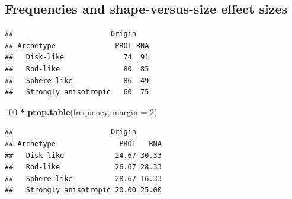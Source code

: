 \documentclass[
  10pt,
]{article}
\newenvironment{Shaded}{\begin{snugshade}}{\end{snugshade}}
\newcommand{\AttributeTok}[1]{\textcolor[rgb]{0.13,0.29,0.53}{#1}}
\newcommand{\CommentTok}[1]{\textcolor[rgb]{0.56,0.35,0.01}{\textit{#1}}}
\newcommand{\DecValTok}[1]{\textcolor[rgb]{0.00,0.00,0.81}{#1}}
\newcommand{\FunctionTok}[1]{\textcolor[rgb]{0.13,0.29,0.53}{\textbf{#1}}}
\newcommand{\NormalTok}[1]{#1}
\newcommand{\OtherTok}[1]{\textcolor[rgb]{0.56,0.35,0.01}{#1}}
\newcommand{\SpecialCharTok}[1]{\textcolor[rgb]{0.81,0.36,0.00}{\textbf{#1}}}
\begin{document}
\subsection{Frequencies and shape-versus-size effect
sizes}\label{frequencies-and-shape-versus-size-effect-sizes}

\begin{Shaded}
\end{Shaded}

\begin{verbatim}
##                       Origin
## Archetype              PROT RNA
##   Disk-like              74  91
##   Rod-like               80  85
##   Sphere-like            86  49
##   Strongly anisotropic   60  75
\end{verbatim}

\begin{Shaded}
\begin{Highlighting}[]
\DecValTok{100} \SpecialCharTok{*} \FunctionTok{prop.table}\NormalTok{(frequency, }\AttributeTok{margin =} \DecValTok{2}\NormalTok{)}
\end{Highlighting}
\end{Shaded}

\begin{verbatim}
##                       Origin
## Archetype               PROT   RNA
##   Disk-like            24.67 30.33
##   Rod-like             26.67 28.33
##   Sphere-like          28.67 16.33
##   Strongly anisotropic 20.00 25.00
\end{verbatim}
\end{document}
